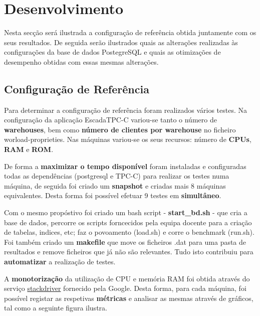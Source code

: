 \chapter{Desenvolvimento} \label{chap:desen}

\hspace{5mm} Nesta secção será ilustrada a configuração de referência obtida juntamente com os seus resultados. De seguida serão ilustrados quais as alterações realizadas às configurações da base de dados PostegreSQL e quais as otimizações de desempenho obtidas com essas mesmas alterações.

\section{Configuração de Referência} \label{sec:refBase}



\hspace{5mm} Para determinar a configuração de referência foram realizados vários testes. Na configuração da aplicação EscadaTPC-C variou-se tanto o número de \textbf{warehouses}, bem como \textbf{número de clientes por warehouse} no ficheiro worload-proprieties. Nas máquinas variou-se os seus recursos: número de \textbf{CPUs}, \textbf{RAM} e \textbf{ROM}.

\hspace{5mm} De forma a \textbf{maximizar o tempo disponível} foram instaladas e configuradas todas as dependências (postgresql e TPC-C) para realizar os testes numa máquina, de seguida foi criado um \textbf{snapshot} e criadas mais 8 máquinas equivalentes. Desta forma foi possível efetuar 9 testes em \textbf{simultâneo}.

\hspace{5mm} Com o mesmo propóstivo foi criado um bash script - \textbf{start\_bd.sh} - que cria a base de dados, percorre os scripts forncecidos pela equipa docente para a criação de tabelas, indices, etc; faz o povoamento (load.sh) e corre o benchmark (run.sh). Foi também criado um \textbf{makefile} que move os ficheiros .dat para uma pasta de resultados e remove ficheiros que já não são relevantes. Tudo isto contribuiu para \textbf{automatizar} a realização de testes.  

\hspace{5mm} A \textbf{monotorização} da utilização de CPU e memória RAM foi obtida através do serviço  \textcolor{blue}{\href{https://cloud.google.com/stackdriver/}{stackdriver}} fornecido pela Google. Desta forma, para cada máquina, foi possível registar as respetivas \textbf{métricas} e analisar as mesmas através de gráficos, tal como a seguinte figura ilustra.

